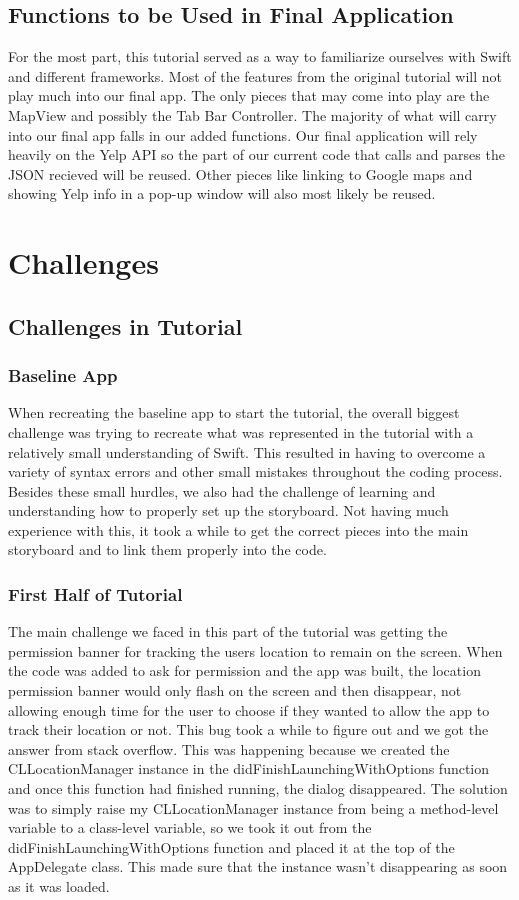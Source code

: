 \documentclass[conference]{IEEEtran}
\begin{document}
\subsection{Functions to be Used in Final Application}
For the most part, this tutorial served as a way to familiarize ourselves with 
Swift and different frameworks. Most of the features from the original tutorial
will not play much into our final app. The only pieces that may come into play
are the MapView and possibly the Tab Bar Controller. The majority of what will
carry into our final app falls in our added functions. Our final application will
rely heavily on the Yelp API so the part of our current code that calls and parses
the JSON recieved will be reused. Other pieces like linking to Google maps and 
showing Yelp info in a pop-up window will also most likely be reused.

\section{Challenges}

\subsection{Challenges in Tutorial}

\subsubsection{Baseline App}
When recreating the baseline app to start the tutorial, the overall biggest challenge
was trying to recreate what was represented in the tutorial with a relatively small
understanding of Swift. This resulted in having to overcome a variety of syntax errors
and other small mistakes throughout the coding process. Besides these small hurdles,
we also had the challenge of learning and understanding how to properly set up the 
storyboard. Not having much experience with this, it took a while to get the correct 
pieces into the main storyboard and to link them properly into the code.

\subsubsection{First Half of Tutorial}
The main challenge we faced in this part of the tutorial was getting the permission 
banner for tracking the users location to remain on the screen. When the code was 
added to ask for permission and the app was built, the location permission banner 
would only flash on the screen and then disappear, not allowing enough time for the 
user to choose if they wanted to allow the app to track their location or not. This bug 
took a while to figure out and we got the answer from stack overflow. This was happening 
because we created the CLLocationManager instance in the didFinishLaunchingWithOptions 
function and once this function had finished running, the dialog disappeared. The solution 
was to simply raise my CLLocationManager instance from being a method-level variable to a 
class-level variable, so we took it out from the didFinishLaunchingWithOptions function and 
placed it at the top of the AppDelegate class. This made sure that the instance wasn't 
disappearing as soon as it was loaded. 
\end{document}
